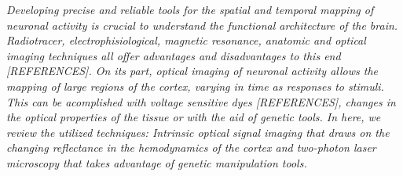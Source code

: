 \label{cap:Technology}

\textit{Developing precise and reliable tools for the spatial and temporal mapping of neuronal activity is crucial to understand the functional architecture of the brain. Radiotracer, electrophisiological, magnetic resonance, anatomic and optical imaging techniques all offer advantages and disadvantages to this end [REFERENCES]. On its part, optical imaging of neuronal activity allows the mapping of large regions of the cortex, varying in time as responses to stimuli. This can be acomplished with voltage sensitive dyes [REFERENCES], changes in the optical properties of the tissue or with the aid of genetic tools. In here, we review the utilized techniques: Intrinsic optical signal imaging that draws on the changing reflectance in the hemodynamics of the cortex and two-photon laser microscopy that takes advantage of genetic manipulation tools.}





\cleardoublepage
